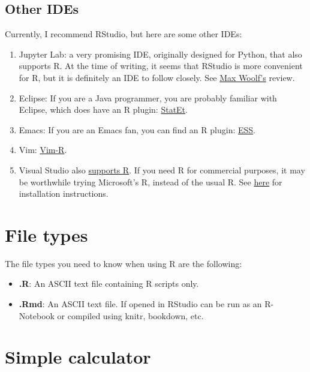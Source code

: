 \documentclass[]{book}
\providecommand{\tightlist}{%
  \setlength{\itemsep}{0pt}\setlength{\parskip}{0pt}}
\theoremstyle{definition}
\theoremstyle{definition}
\theoremstyle{definition}
\theoremstyle{remark}
\begin{document}
\subsection{Other IDEs}\label{other-ides}

Currently, I recommend RStudio, but here are some other IDEs:

\begin{enumerate}
\def\labelenumi{\arabic{enumi}.}
\item
  Jupyter Lab: a very promising IDE, originally designed for Python,
  that also supports R. At the time of writing, it seems that RStudio is
  more convenient for R, but it is definitely an IDE to follow closely.
  See \href{http://minimaxir.com/2017/06/r-notebooks/}{Max Woolf's}
  review.
\item
  Eclipse: If you are a Java programmer, you are probably familiar with
  Eclipse, which does have an R plugin:
  \href{http://www.walware.de/goto/statet}{StatEt}.
\item
  Emacs: If you are an Emacs fan, you can find an R plugin:
  \href{http://ess.r-project.org/}{ESS}.
\item
  Vim: \href{https://github.com/vim-scripts/Vim-R-plugin}{Vim-R}.
\item
  Visual Studio also
  \href{https://www.visualstudio.com/vs/features/rtvs/}{supports R}. If
  you need R for commercial purposes, it may be worthwhile trying
  Microsoft's R, instead of the usual R. See
  \href{https://mran.microsoft.com/documents/rro/installation}{here} for
  installation instructions.
\end{enumerate}

\section{File types}\label{file-types}

The file types you need to know when using R are the following:

\begin{itemize}
\tightlist
\item
  \textbf{.R}: An ASCII text file containing R scripts only.
\item
  \textbf{.Rmd}: An ASCII text file. If opened in RStudio can be run as
  an R-Notebook or compiled using knitr, bookdown, etc.
\end{itemize}

\section{Simple calculator}\label{simple-calculator}
\end{document}
